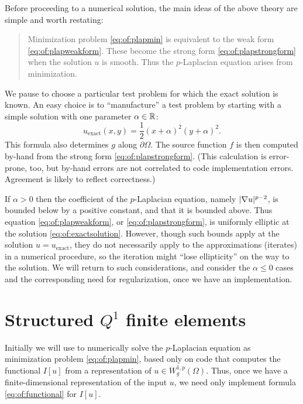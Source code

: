 Before proceeding to a numerical solution, the main ideas of the above theory are simple and worth restating:
\begin{quote}
Minimization problem \eqref{eq:of:plapmin} is equivalent to the weak form \eqref{eq:of:plapweakform}.  These become the strong form \eqref{eq:of:plapstrongform} when the solution $u$ is smooth.  Thus the $p$-Laplacian equation arises from minimization.
\end{quote}

We pause to choose a particular test problem for which the exact solution is known.  An easy choice is to ``manufacture'' a test problem by starting with a simple solution with one parameter $\alpha\in\mathbb{R}$:
\begin{equation}
    u_{\text{exact}}(x,y) = \frac{1}{2} (x+\alpha)^2 (y+\alpha)^2. \label{eq:of:exactsolution}
\end{equation}
This formula also determines $g$ along $\partial \Omega$.  The source function $f$ is then computed by-hand from the strong form \eqref{eq:of:plapstrongform}.  (This calculation is error-prone, too, but by-hand errors are not correlated to code implementation errors.  Agreement is likely to reflect correctness.)

If $\alpha>0$ then the coefficient of the $p$-Laplacian equation, namely $|\nabla u|^{p-2}$, is bounded below by a positive constant, and that it is bounded above.  Thus equation \eqref{eq:of:plapweakform}, or \eqref{eq:of:plapstrongform}, is uniformly elliptic \citep{Evans2010} at the solution \eqref{eq:of:exactsolution}.  However, though such bounds apply at the solution $u=u_{\text{exact}}$, they do not necessarily apply to the approximations (iterates) in a numerical procedure, so the iteration might ``lose ellipticity'' on the way to the solution.  We will return to such considerations, and consider the $\alpha \le 0$ cases and the corresponding need for regularization, once we have an implementation.


\section{Structured $Q^1$ finite elements}

Initially we will use \PETSc to numerically solve the $p$-Laplacian equation as minimization problem \eqref{eq:of:plapmin}, based only on code that computes the functional $I[u]$ from a representation of $u \in W_g^{1,p}(\Omega)$.  Thus, once we have a finite-dimensional representation of the input $u$, we need only implement formula \eqref{eq:of:functional} for $I[u]$.

